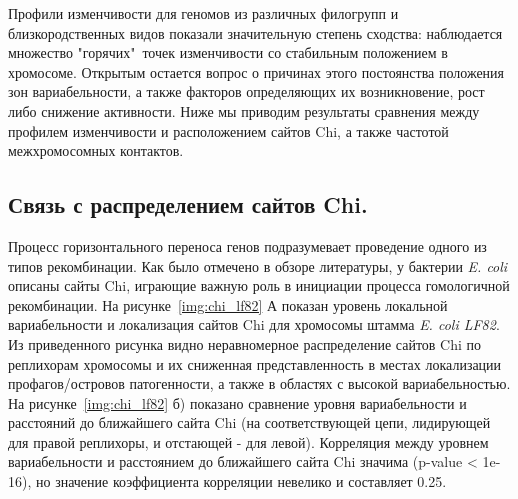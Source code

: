 Профили изменчивости для геномов из различных филогрупп и близкородственных видов показали значительную степень сходства: наблюдается множество "горячих"\ точек изменчивости со стабильным положением в хромосоме. Открытым остается вопрос о причинах этого постоянства положения зон вариабельности, а также факторов определяющих их возникновение, рост либо снижение активности. Ниже мы приводим результаты сравнения между профилем изменчивости и расположением сайтов Chi, а также частотой межхромосомных контактов. 

\subsection{Связь с распределением сайтов Chi.}
Процесс горизонтального переноса генов подразумевает проведение одного из типов рекомбинации. Как было отмечено в обзоре литературы, у бактерии \textit{E. coli} описаны сайты Chi, играющие важную роль в инициации процесса гомологичной рекомбинации. 
На рисунке~\ref{img:chi_lf82} А показан уровень локальной вариабельности и локализация сайтов Chi для хромосомы штамма \textit{E. coli LF82}. Из приведенного рисунка видно неравномерное распределение сайтов Chi по реплихорам хромосомы и их сниженная представленность в местах локализации профагов/островов патогенности, а также в областях с высокой вариабельностью. На рисунке~\ref{img:chi_lf82} б) показано сравнение уровня вариабельности и расстояний до ближайшего сайта Chi (на соответствующей цепи, лидирующей для правой реплихоры, и отстающей - для левой). Корреляция между уровнем вариабельности и расстоянием до ближайшего сайта Chi значима (p-value < 1e-16), но значение коэффициента корреляции невелико и составляет 0.25.
